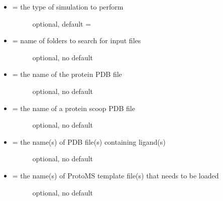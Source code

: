 \documentclass[letterpaper,10pt,english]{manual}
\begin{document}
\begin{itemize}
\item {} \begin{description}
\item[{ = the type of simulation to perform}] \leavevmode
optional, default = 

\end{description}

\item {} \begin{description}
\item[{ = name of folders to search for input files}] \leavevmode
optional, no default

\end{description}

\item {} \begin{description}
\item[{ = the name of the protein PDB file}] \leavevmode
optional, no default

\end{description}

\item {} \begin{description}
\item[{ = the name of a protein scoop PDB file}] \leavevmode
optional, no default

\end{description}

\item {} \begin{description}
\item[{ = the name(s) of PDB file(s) containing ligand(s)}] \leavevmode
optional, no default

\end{description}

\item {} \begin{description}
\item[{ = the name(s) of ProtoMS template file(s) that needs to be loaded}] \leavevmode
optional, no default

\end{description}


\end{itemize}
\end{document}
